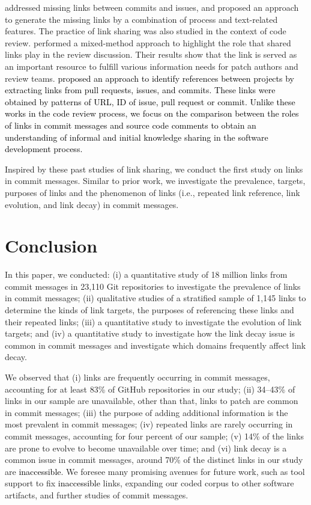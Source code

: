 \documentclass[smallextended]{svjour3}       %
\newcommand{\fix}[1]{\textcolor{black}{#1}}
\newcommand{\minor}[1]{\textcolor{black}{#1}}
\begin{document}
\cite{rath2018traceability} addressed missing links between commits and issues, and proposed an approach to generate the missing links by a combination of process and text-related features. The practice of link sharing was also studied in the context of code review. \cite{wang2021understanding} performed a mixed-method approach to highlight the role that shared links play in the review discussion. Their results show that the link is served as an important resource to fulfill various information needs for patch authors and review teams. \fix{\cite{liu2022method} proposed an approach to identify references between projects by extracting links from pull requests, issues, and commits. These links were obtained by patterns of URL, ID of issue, pull request or commit.} \fix{Unlike these
works in the code review process, we focus on the comparison between the roles of links
in commit messages and source code comments to obtain an understanding of informal and initial
knowledge sharing in the software development process.}

Inspired by these past studies of link sharing, we conduct the first study on links in commit messages. Similar to prior work, we investigate the prevalence, targets, purposes of links and the phenomenon of links (i.e., repeated link reference, link evolution, and link decay) in commit messages.

\section{Conclusion}
\label{sec:cs}
In this paper, we conducted: (i) a quantitative study of 18 million links from commit messages in 23,110 Git repositories to investigate the prevalence of links in commit messages; (ii) qualitative studies of a stratified sample of 1,145 links to determine the kinds of link targets, the purposes of referencing these links and their repeated links; (iii) a quantitative study to investigate the evolution of link targets; and (iv) a quantitative study to investigate how the link decay issue is common in commit messages and investigate which domains frequently affect link decay.

We observed that (i) links are frequently occurring in commit messages, accounting for at least 83\% of GitHub repositories in our study; (ii) 34--43\% of links in our sample are unavailable, other than that, links to patch are common in commit messages; (iii) the purpose of adding additional information is the most prevalent in commit messages; (iv) repeated links are rarely occurring in commit messages, accounting for four percent of our sample; (v) 14\% of the links are prone to evolve to become unavailable over time; and (vi) link decay is a common issue in commit messages, around 70\% of the distinct links in our study are \minor{inaccessible}. We foresee many promising avenues for future
work, such as tool support to fix \minor{inaccessible} links, expanding our
coded corpus to other software artifacts, and
further studies of commit messages.
\end{document}
